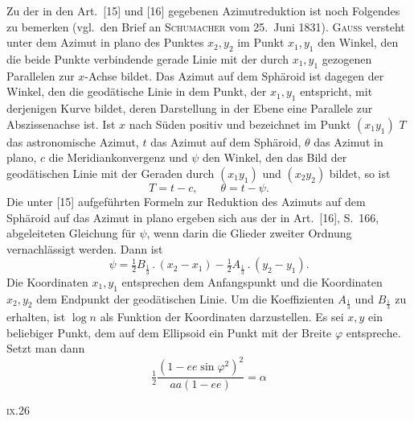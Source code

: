 {Zu der in den Art.\ [15] und [16] gegebenen Azimutreduktion ist noch Folgendes zu
bemerken (vgl.\ den Brief an \textsc{Schumacher} vom 25.\ Juni 1831).
\textsc{Gauss} versteht unter dem Azimut in plano des Punktes \(x_2,y_2\) im Punkt
\(x_1,y_1\) den Winkel, den die beide Punkte verbindende gerade Linie mit der durch
\(x_1,y_1\) gezogenen Parallelen zur \(x\)-Achse bildet. Das Azimut auf dem Sphäroid ist
dagegen der Winkel, den die geodätische Linie in dem Punkt, der \(x_1,y_1\) entspricht,
mit derjenigen Kurve bildet, deren Darstellung in der Ebene eine Parallele zur
Abszissenachse ist. Ist \(x\) nach Süden positiv und bezeichnet im Punkt \((x_1y_1)\)
\(T\) das astronomische Azimut, \(t\) das Azimut auf dem Sphäroid, \(\theta\) das
Azimut in plano, \(c\) die Meridiankonvergenz und \(\psi\) den Winkel, den das Bild
der geodätischen Linie mit der Geraden durch \((x_1y_1)\) und \((x_2y_2)\) bildet, so ist
\[
T=t-c,\qquad \theta=t-\psi.
\]
Die unter [15] aufgeführten Formeln zur Reduktion des Azimuts auf dem Sphäroid auf
das Azimut in plano ergeben sich aus der in Art.\ [16], S.\ 166, abgeleiteten
Gleichung für \(\psi\), wenn darin die Glieder zweiter Ordnung vernachlässigt werden.
Dann ist
\[
\psi=\tfrac12 B_{\frac13}\,.\,(x_2-x_1)-\tfrac12 A_{\frac13}\,.\,(y_2-y_1).
\]
Die Koordinaten \(x_1,y_1\) entsprechen dem Anfangspunkt und die Koordinaten \(x_2,y_2\)
dem Endpunkt der geodätischen Linie. Um die Koeffizienten \(A_{\frac13}\) und
\(B_{\frac13}\) zu erhalten, ist \(\log n\) als Funktion der Koordinaten darzustellen.
Es sei \(x,y\) ein beliebiger Punkt, dem auf dem Ellipsoid ein Punkt mit der Breite
\(\varphi\) entspreche. Setzt man dann
\begin{equation*}
\tfrac12\frac{(1-ee\sin\varphi^2)^2}{aa(1-ee)}=\alpha
\tag*{1)}
\end{equation*}
\par}
\noindent\textsc{ix.}\hfill 26\hspace*{.12\linewidth}\par
\endgroup
